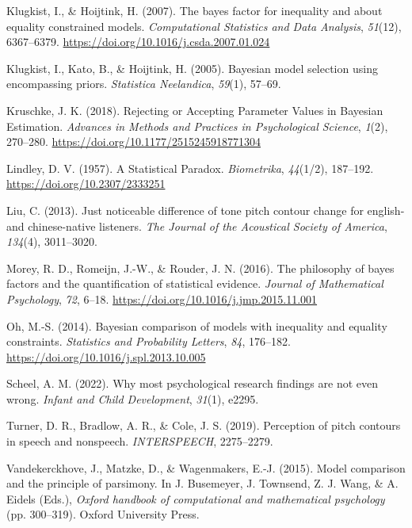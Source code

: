 \documentclass[
  doc,
  floatsintext,
  longtable,
  nolmodern,
  notxfonts,
  notimes,
  colorlinks=true,linkcolor=blue,citecolor=blue,urlcolor=blue]{apa7}
\newlength{\cslhangindent}
\newenvironment{CSLReferences}[2] %
 {\begin{list}{}{%
  \setlength{\itemindent}{0pt}
  \setlength{\leftmargin}{0pt}
  \setlength{\parsep}{0pt}
  \ifodd #1
   \setlength{\leftmargin}{\cslhangindent}
   \setlength{\itemindent}{-1\cslhangindent}
  \fi
  \setlength{\itemsep}{#2\baselineskip}}}
 {\end{list}}
\begin{document}
\begin{CSLReferences}{1}{0}
Klugkist, I., \& Hoijtink, H. (2007). The bayes factor for inequality
and about equality constrained models. \emph{Computational Statistics
and Data Analysis}, \emph{51}(12), 6367--6379.
\url{https://doi.org/10.1016/j.csda.2007.01.024}

Klugkist, I., Kato, B., \& Hoijtink, H. (2005). Bayesian model selection
using encompassing priors. \emph{Statistica Neelandica}, \emph{59}(1),
57--69.

Kruschke, J. K. (2018). Rejecting or {Accepting Parameter Values} in
{Bayesian Estimation}. \emph{Advances in Methods and Practices in
Psychological Science}, \emph{1}(2), 270--280.
\url{https://doi.org/10.1177/2515245918771304}

Lindley, D. V. (1957). A {Statistical Paradox}. \emph{Biometrika},
\emph{44}(1/2), 187--192. \url{https://doi.org/10.2307/2333251}

Liu, C. (2013). Just noticeable difference of tone pitch contour change
for english-and chinese-native listeners. \emph{The Journal of the
Acoustical Society of America}, \emph{134}(4), 3011--3020.

Morey, R. D., Romeijn, J.-W., \& Rouder, J. N. (2016). The philosophy of
bayes factors and the quantification of statistical evidence.
\emph{Journal of Mathematical Psychology}, \emph{72}, 6--18.
\url{https://doi.org/10.1016/j.jmp.2015.11.001}

Oh, M.-S. (2014). Bayesian comparison of models with inequality and
equality constraints. \emph{Statistics and Probability Letters},
\emph{84}, 176--182. \url{https://doi.org/10.1016/j.spl.2013.10.005}

Scheel, A. M. (2022). Why most psychological research findings are not
even wrong. \emph{Infant and Child Development}, \emph{31}(1), e2295.

Turner, D. R., Bradlow, A. R., \& Cole, J. S. (2019). Perception of
pitch contours in speech and nonspeech. \emph{INTERSPEECH}, 2275--2279.

Vandekerckhove, J., Matzke, D., \& Wagenmakers, E.-J. (2015). Model
comparison and the principle of parsimony. In J. Busemeyer, J. Townsend,
Z. J. Wang, \& A. Eidels (Eds.), \emph{Oxford handbook of computational
and mathematical psychology} (pp. 300--319). Oxford University Press.


\end{CSLReferences}
\end{document}
